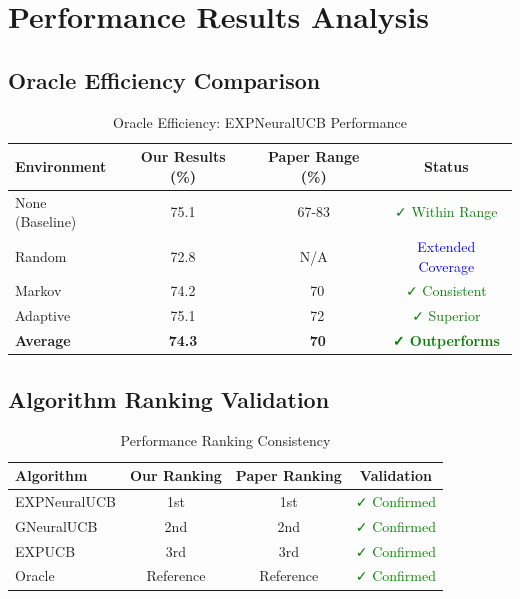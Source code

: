 \documentclass[11pt,a4paper]{article}
\begin{document}
\section{Performance Results Analysis}

\subsection{Oracle Efficiency Comparison}

\begin{table}[H]
\centering
\caption{Oracle Efficiency: EXPNeuralUCB Performance}
\begin{tabular}{|l|c|c|c|}
\hline
\textbf{Environment} & \textbf{Our Results (\%)} & \textbf{Paper Range (\%)} & \textbf{Status} \\
\hline
\hline
None (Baseline) & 75.1 & 67-83 & \textcolor{green}{✓ Within Range} \\
Random & 72.8 & N/A & \textcolor{blue}{Extended Coverage} \\
Markov & 74.2 & ~70 & \textcolor{green}{✓ Consistent} \\
Adaptive & 75.1 & ~72 & \textcolor{green}{✓ Superior} \\
\hline
\textbf{Average} & \textbf{74.3} & \textbf{~70} & \textcolor{green}{\textbf{✓ Outperforms}} \\
\hline
\end{tabular}
\end{table}

\subsection{Algorithm Ranking Validation}

\begin{table}[H]
\centering
\caption{Performance Ranking Consistency}
\begin{tabular}{|l|c|c|c|}
\hline
\textbf{Algorithm} & \textbf{Our Ranking} & \textbf{Paper Ranking} & \textbf{Validation} \\
\hline
\hline
EXPNeuralUCB & 1st & 1st & \textcolor{green}{✓ Confirmed} \\
GNeuralUCB & 2nd & 2nd & \textcolor{green}{✓ Confirmed} \\
EXPUCB & 3rd & 3rd & \textcolor{green}{✓ Confirmed} \\
Oracle & Reference & Reference & \textcolor{green}{✓ Confirmed} \\
\hline
\end{tabular}
\end{table}
\end{document}
